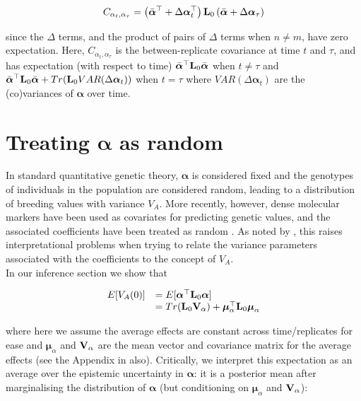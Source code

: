 \documentclass[12pt]{article}
\begin{document}
\begin{bibunit}
\begin{equation}
C_{\alpha_t, \alpha_\tau} = \left(\bar{\boldsymbol \alpha}^{\top}+\Delta{\boldsymbol \alpha}_t^{\top}\right){\bf L}_0\left(\bar{\boldsymbol \alpha}+\Delta{\boldsymbol \alpha}_\tau\right)
\end{equation}

since the $\Delta$ terms, and the product of pairs of $\Delta$ terms when $n\neq m$, have zero expectation. Here, $C_{\alpha_t, \alpha_\tau}$ is the between-replicate covariance at time $t$ and $\tau$, and has expectation (with respect to time) $\bar{\boldsymbol \alpha}^{\top}{\bf L}_0\bar{\boldsymbol \alpha}$ when $t\neq\tau$ and $\bar{\boldsymbol \alpha}^{\top}{\bf L}_0\bar{\boldsymbol \alpha}+Tr({\bf L}_0VAR(\Delta{\boldsymbol \alpha}_t))$ when $t=\tau$ where $VAR(\Delta{\boldsymbol \alpha}_t)$ are the (co)variances of $\boldsymbol{\alpha}$ over time.




\section{Treating $\boldsymbol{\alpha}$ as random}
\label{App:alpha_random}

In standard quantitative genetic theory, $\boldsymbol{\alpha}$ is considered fixed and the genotypes of individuals in the population are considered random, leading to a distribution of breeding values with variance $V_A$. More recently, however, dense molecular markers have been used as covariates for predicting genetic values, and the associated coefficients have been treated as random \citep{meuwissen2001prediction}. As noted by \citet{gianola2009additive}, this raises interpretational problems when trying to relate the variance parameters associated with the coefficients to the concept of $V_A$.\\ 

In our inference section we show that

\begin{equation}
\begin{array}{rl}
E[V_A(0)] &= E[\boldsymbol{\alpha}^{\top}\textbf{L}_0{\boldsymbol{\alpha}}]\\
&= Tr(\textbf{L}_0{\bf V}_{\alpha}) + \boldsymbol{\mu}_{{\alpha}}^{\top}\textbf{L}_0\boldsymbol{\mu}_{{\alpha}}\\
\end{array}
\end{equation}

where here we assume the average effects are constant across time/replicates for ease and $\boldsymbol{\mu}_{{\alpha}}$ and ${\bf V}_{{\alpha}}$ are the mean vector and covariance matrix for the average effects (see the Appendix in \citet{gianola2009additive} also). Critically, we interpret this expectation as an average over the epistemic uncertainty in  $\boldsymbol{\alpha}$: it is a posterior mean after marginalising the distribution of $\boldsymbol{\alpha}$ (but conditioning on $\boldsymbol{\mu}_{\alpha}$ and ${\bf V}_{\alpha}$):


\end{bibunit}
\end{document}
